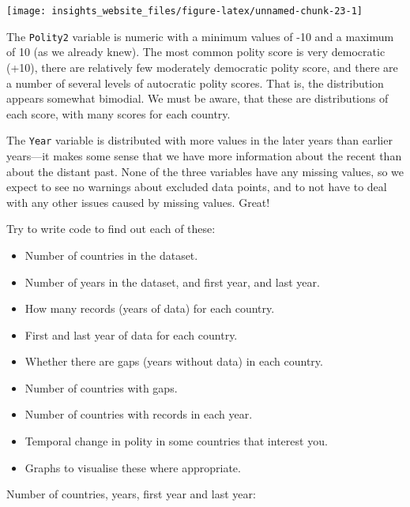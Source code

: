 \documentclass[]{book}
\newenvironment{Shaded}{\begin{snugshade}}{\end{snugshade}}
\newcommand{\DataTypeTok}[1]{\textcolor[rgb]{0.13,0.29,0.53}{#1}}
\newcommand{\KeywordTok}[1]{\textcolor[rgb]{0.13,0.29,0.53}{\textbf{#1}}}
\newcommand{\NormalTok}[1]{#1}
\newcommand{\OperatorTok}[1]{\textcolor[rgb]{0.81,0.36,0.00}{\textbf{#1}}}
\newcommand{\StringTok}[1]{\textcolor[rgb]{0.31,0.60,0.02}{#1}}
\providecommand{\tightlist}{%
  \setlength{\itemsep}{0pt}\setlength{\parskip}{0pt}}
\begin{document}
\begin{center}\texttt{[image: insights\_website\_files/figure-latex/unnamed-chunk-23-1]} \end{center}

The \texttt{Polity2} variable is numeric with a minimum values of -10 and a maximum of 10 (as we already knew). The most common polity score is very democratic (+10), there are relatively few moderately democratic polity score, and there are a number of several levels of autocratic polity scores. That is, the distribution appears somewhat bimodial. We must be aware, that these are distributions of each score, with many scores for each country.

The \texttt{Year} variable is distributed with more values in the later years than earlier years---it makes some sense that we have more information about the recent than about the distant past. None of the three variables have any missing values, so we expect to see no warnings about excluded data points, and to not have to deal with any other issues caused by missing values. Great!

Try to write code to find out each of these:

\begin{itemize}
\tightlist
\item
  Number of countries in the dataset.
\item
  Number of years in the dataset, and first year, and last year.
\item
  How many records (years of data) for each country.
\item
  First and last year of data for each country.
\item
  Whether there are gaps (years without data) in each country.
\item
  Number of countries with gaps.
\item
  Number of countries with records in each year.
\item
  Temporal change in polity in some countries that interest you.
\item
  Graphs to visualise these where appropriate.
\end{itemize}

Number of countries, years, first year and last year:

\begin{Shaded}
\end{Shaded}
\end{document}
